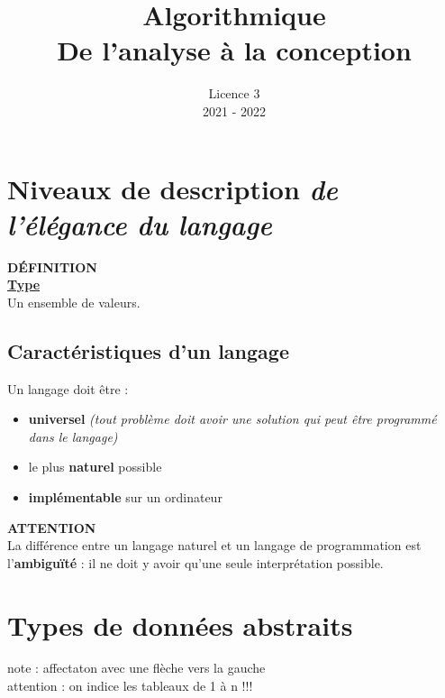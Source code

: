 \documentclass{article}
\title{Algorithmique\\De l'analyse à la conception}
\author{}
\date{Licence 3\\2021 - 2022}
\begin{document}
\normalsize
\maketitle

\renewcommand*\contentsname{Table des matières}
\tableofcontents
\newpage
\section{Niveaux de description \textit{de l'élégance du langage}}

\begin{definition}
{ \scriptsize \textcolor{definition}{ \textbf{DÉFINITION}}}
\vspace{3px}
\\ \underline{\textbf{Type}}
\vspace{2.5px}
\\ Un ensemble de valeurs.
\end{definition}

\subsection{Caractéristiques d'un langage}
Un langage doit être :
\begin{itemize}
  \item \textbf{universel} \textit{(tout problème doit avoir une solution qui peut être programmé dans le langage)}
  \item le plus \textbf{naturel} possible
  \item \textbf{implémentable} sur un ordinateur
\end{itemize}

\begin{danger}
{ \scriptsize \textcolor{danger-color}{ \textbf{ATTENTION}}}
\vspace{3px}
\\La différence entre un langage naturel et un langage de programmation est l'\textbf{ambiguïté} : il ne doit y avoir qu'une seule interprétation possible.
\end{danger}


\section{Types de données abstraits}
note : affectaton avec une flèche vers la gauche
\\attention : on indice les tableaux de 1 à n !!!
\end{document}
